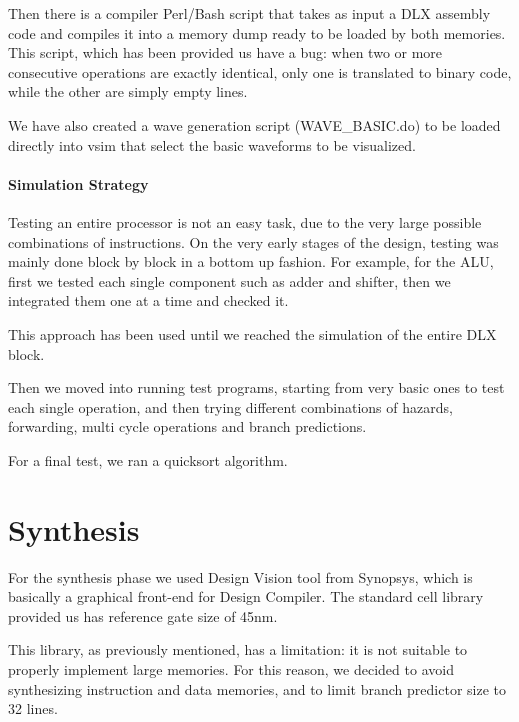 \documentclass[12pt]{article}
\begin{document}
Then there is a compiler Perl/Bash script that takes as input a DLX assembly code and compiles it into a memory dump ready to be loaded by both memories.
This script, which has been provided us have a bug: when two or more consecutive operations are exactly identical, only one is translated to binary code, while the other are simply empty lines.

We have also created a wave generation script (WAVE\_BASIC.do) to be loaded directly into vsim that select the basic waveforms to be visualized.
\paragraph{Simulation Strategy}
Testing an entire processor is not an easy task, due to the very large possible combinations of instructions.
On the very early stages of the design, testing was mainly done block by block in a bottom up fashion.
For example, for the ALU, first we tested each single component such as adder and shifter, then we integrated them one at a time and checked it.

This approach has been used until we reached the simulation of the entire DLX block.


Then we moved into running test programs, starting from very basic ones to test each single operation, and then trying different combinations of hazards, forwarding, multi cycle operations and branch predictions.

For a final test, we ran a quicksort algorithm.


\section{Synthesis}\label{Synthesis}
For the synthesis phase we used Design Vision tool from Synopsys, which is basically a graphical front-end for Design Compiler.
The standard cell library provided us has reference gate size of 45nm.

This library, as previously mentioned, has a limitation: it is not suitable to properly implement large memories.
For this reason, we decided to avoid synthesizing instruction and data memories, and to limit branch predictor size to 32 lines.
\end{document}
